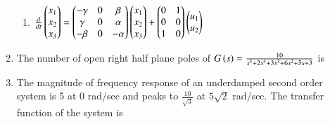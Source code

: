 \documentclass[a4paper, 11pt]{article}
\begin{document}
\begin{enumerate}
\begin{enumerate}
        \item $\frac{d}{dt}\begin{pmatrix}x_1 \\ x_2 \\ x_3\end{pmatrix} = \begin{pmatrix}-\gamma & 0 & \beta \\ \gamma & 0 & \alpha \\ -\beta & 0 & -\alpha\end{pmatrix}\begin{pmatrix}x_1 \\ x_2 \\ x_3\end{pmatrix} + \begin{pmatrix}0 & 1 \\ 0 & 0 \\ 1 & 0\end{pmatrix}\begin{pmatrix}u_1 \\ u_2\end{pmatrix}$
    \end{enumerate}
    
    \hfill{}
    
    \item The number of open right half plane poles of $G\left(s\right) = \frac{10}{s^5+2s^4+3s^3+6s^2+5s+3}$ is
    \begin{enumerate}
    \end{enumerate}
    
    \hfill{}
    
    \item The magnitude of frequency response of an underdamped second order system is 5 at 0 rad/sec and peaks to $\frac{10}{\sqrt{3}}$ at $5\sqrt{2}$ rad/sec. The transfer function of the system is
    \begin{enumerate}
    \end{enumerate}
    
    \hfill{}


\end{enumerate}
\end{document}
